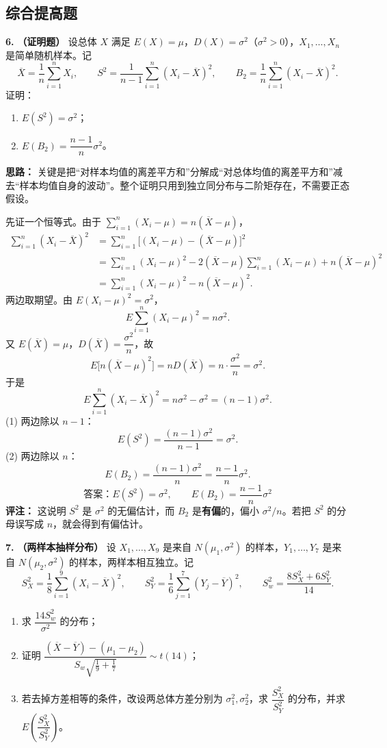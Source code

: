 \newpage
\subsection{综合提高题}

\textbf{6.} \textbf{（证明题）} 设总体 $X$ 满足 $E(X)=\mu$，$D(X)=\sigma^2$（$\sigma^2>0$），$X_1,\ldots,X_n$ 是简单随机样本。记
\[
\overline{X}=\frac1n\sum_{i=1}^{n}X_i,\qquad
S^2=\frac{1}{n-1}\sum_{i=1}^{n}(X_i-\overline{X})^2,\qquad
B_2=\frac1n\sum_{i=1}^{n}(X_i-\overline{X})^2.
\]
证明：
\begin{enumerate}[label=(\arabic*)]
    \item $E(S^2)=\sigma^2$；
    \item $E(B_2)=\dfrac{n-1}{n}\sigma^2$。
\end{enumerate}

\ifshowsolutions%
\textbf{思路：} 关键是把“对样本均值的离差平方和”分解成“对总体均值的离差平方和”减去“样本均值自身的波动”。整个证明只用到独立同分布与二阶矩存在，不需要正态假设。

先证一个恒等式。由于 $\sum_{i=1}^{n}(X_i-\mu)=n(\overline{X}-\mu)$，
\[
\begin{aligned}
\sum_{i=1}^{n}(X_i-\overline{X})^2
&=\sum_{i=1}^{n}\bigl[(X_i-\mu)-(\overline{X}-\mu)\bigr]^2\\
&=\sum_{i=1}^{n}(X_i-\mu)^2
-2(\overline{X}-\mu)\sum_{i=1}^{n}(X_i-\mu)
+n(\overline{X}-\mu)^2\\
&=\sum_{i=1}^{n}(X_i-\mu)^2-n(\overline{X}-\mu)^2.
\end{aligned}
\]
两边取期望。由 $E(X_i-\mu)^2=\sigma^2$，
\[
E\sum_{i=1}^{n}(X_i-\mu)^2=n\sigma^2.
\]
又 $E(\overline{X})=\mu$，$D(\overline{X})=\dfrac{\sigma^2}{n}$，故
\[
E\bigl[n(\overline{X}-\mu)^2\bigr]=nD(\overline{X})=n\cdot\frac{\sigma^2}{n}=\sigma^2.
\]
于是
\[
E\sum_{i=1}^{n}(X_i-\overline{X})^2=n\sigma^2-\sigma^2=(n-1)\sigma^2.
\]
(1) 两边除以 $n-1$：
\[
E(S^2)=\frac{(n-1)\sigma^2}{n-1}=\sigma^2.
\]
(2) 两边除以 $n$：
\[
E(B_2)=\frac{(n-1)\sigma^2}{n}=\frac{n-1}{n}\sigma^2.
\]
\[
\boxed{\text{答案：}E(S^2)=\sigma^2,\qquad E(B_2)=\frac{n-1}{n}\sigma^2}
\]
\textbf{评注：} 这说明 $S^2$ 是 $\sigma^2$ 的无偏估计，而 $B_2$ 是\textbf{有偏}的，偏小 $\sigma^2/n$。若把 $S^2$ 的分母误写成 $n$，就会得到有偏估计。
\else \answerarea[8] \fi%

\textbf{7.} \textbf{（两样本抽样分布）} 设 $X_1,\ldots,X_9$ 是来自 $N(\mu_1,\sigma^2)$ 的样本，$Y_1,\ldots,Y_7$ 是来自 $N(\mu_2,\sigma^2)$ 的样本，两样本相互独立。记
\[
S_X^2=\frac{1}{8}\sum_{i=1}^{9}(X_i-\overline{X})^2,\qquad
S_Y^2=\frac{1}{6}\sum_{j=1}^{7}(Y_j-\overline{Y})^2,\qquad
S_w^2=\frac{8S_X^2+6S_Y^2}{14}.
\]
\begin{enumerate}[label=(\arabic*)]
    \item 求 $\dfrac{14S_w^2}{\sigma^2}$ 的分布；
    \item 证明 $\dfrac{(\overline{X}-\overline{Y})-(\mu_1-\mu_2)}{S_w\sqrt{\frac19+\frac17}}\sim t(14)$；
    \item 若去掉方差相等的条件，改设两总体方差分别为 $\sigma_1^2,\sigma_2^2$，求 $\dfrac{S_X^2}{S_Y^2}$ 的分布，并求 $E\!\left(\dfrac{S_X^2}{S_Y^2}\right)$。
\end{enumerate}

